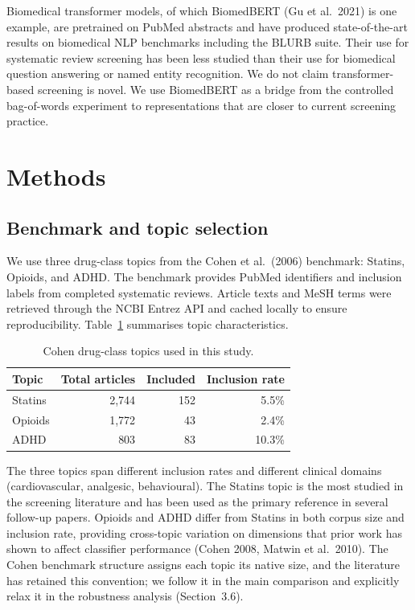 \documentclass[11pt,a4paper]{article}
\begin{document}
Biomedical transformer models, of which BiomedBERT (Gu et al.\ 2021) is one example, are pretrained on PubMed abstracts and have produced state-of-the-art results on biomedical NLP benchmarks including the BLURB suite. Their use for systematic review screening has been less studied than their use for biomedical question answering or named entity recognition. We do not claim transformer-based screening is novel. We use BiomedBERT as a bridge from the controlled bag-of-words experiment to representations that are closer to current screening practice.

\section{Methods}

\subsection{Benchmark and topic selection}

We use three drug-class topics from the Cohen et al.\ (2006) benchmark: Statins, Opioids, and ADHD. The benchmark provides PubMed identifiers and inclusion labels from completed systematic reviews. Article texts and MeSH terms were retrieved through the NCBI Entrez API and cached locally to ensure reproducibility. Table~\ref{tab:topics} summarises topic characteristics.

\begin{table}[h]
\centering
\small
\begin{tabular}{lrrr}
\toprule
Topic & Total articles & Included & Inclusion rate \\
\midrule
Statins & 2,744 & 152 & 5.5\% \\
Opioids & 1,772 & 43 & 2.4\% \\
ADHD & 803 & 83 & 10.3\% \\
\bottomrule
\end{tabular}
\caption{Cohen drug-class topics used in this study.}
\label{tab:topics}
\end{table}

The three topics span different inclusion rates and different clinical domains (cardiovascular, analgesic, behavioural). The Statins topic is the most studied in the screening literature and has been used as the primary reference in several follow-up papers. Opioids and ADHD differ from Statins in both corpus size and inclusion rate, providing cross-topic variation on dimensions that prior work has shown to affect classifier performance (Cohen 2008, Matwin et al.\ 2010). The Cohen benchmark structure assigns each topic its native size, and the literature has retained this convention; we follow it in the main comparison and explicitly relax it in the robustness analysis (Section~3.6).
\end{document}

